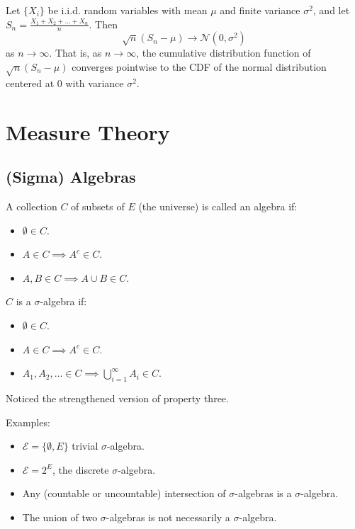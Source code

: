 \documentclass[12pt, titlepage]{article}
\begin{document}
\begin{theo}{}
Let $\{X_i\}$ be i.i.d. random variables with mean $\mu$ and finite variance $\sigma^2$, and let $S_n = \frac{X_1 + X_2 + \dots + X_n}{n}$. Then
\[\sqrt{n}(S_n - \mu) \to \mathcal{N}(0, \sigma^2)\]
as $n \to \infty$. That is, as $n \to \infty$, the cumulative distribution function of $\sqrt{n}(S_n - \mu)$ converges pointwise to the CDF of the normal distribution centered at $0$ with variance $\sigma^2$.
\end{theo}

\section{Measure Theory}

\subsection{(Sigma) Algebras}

\begin{dfn}
	A collection $C$ of subsets of $E$ (the universe) is called an algebra if:
	\begin{itemize}
		\item $\emptyset \in C$.
		\item $A \in C \implies A^c \in C$.
		\item $A, B \in C \implies A \cup B \in C$.
	\end{itemize}
	$C$ is a $\sigma$-algebra if:
	\begin{itemize}
		\item $\emptyset \in C$.
		\item $A \in C \implies A^c \in C$.
		\item $A_1, A_2, \dots \in C \implies \bigcup^\infty_{i = 1}A_i \in C$.
	\end{itemize}
	Noticed the strengthened version of property three.
\end{dfn}

Examples:
\begin{itemize}
	\item $\mathcal{E} = \{\emptyset, E\}$ trivial $\sigma$-algebra.
	\item $\mathcal{E} = 2^E$, the discrete $\sigma$-algebra.
\end{itemize}

\begin{theo}{}
\begin{itemize}
	\item Any (countable or uncountable) intersection of $\sigma$-algebras is a $\sigma$-algebra.
	\item The union of two $\sigma$-algebras is not necessarily a $\sigma$-algebra.\\
\end{itemize}
\end{theo}
\end{document}
